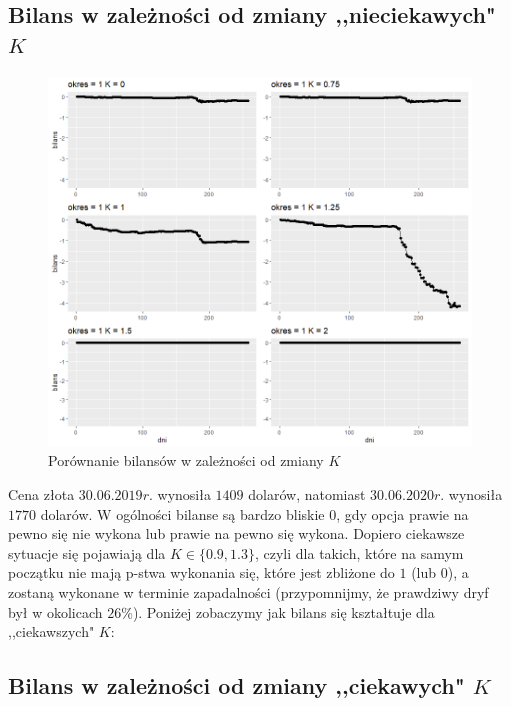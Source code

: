 \documentclass[12pt]{article}
\begin{document}
\newpage
\subsection{Bilans w zależności od zmiany ,,nieciekawych" $K$}

\begin{figure}[ht!]
\centering
\includegraphics[width=\linewidth]{bilans_prawdziwa_trajektoria_gold_zmiana_K_nieciekawe_rowna_skala.png}
\caption{Porównanie bilansów w zależności od zmiany $K$}
\end{figure}

Cena złota $30.06.2019r.$ wynosiła $1409$ dolarów, natomiast $30.06.2020r.$ wynosiła $1770$ dolarów. W ogólności bilanse są bardzo bliskie $0$, gdy opcja prawie na pewno się nie wykona lub prawie na pewno się wykona. Dopiero ciekawsze sytuacje się pojawiają dla $K \in \{0.9, 1.3\}$, czyli dla takich, które na samym początku nie mają p-stwa wykonania się, które jest zbliżone do $1$ (lub $0$), a zostaną wykonane w terminie zapadalności (przypomnijmy, że prawdziwy dryf był w okolicach $26\%$). Poniżej zobaczymy jak bilans się kształtuje dla ,,ciekawszych" $K$:
\newpage

\subsection{Bilans w zależności od zmiany ,,ciekawych" $K$}
\end{document}
